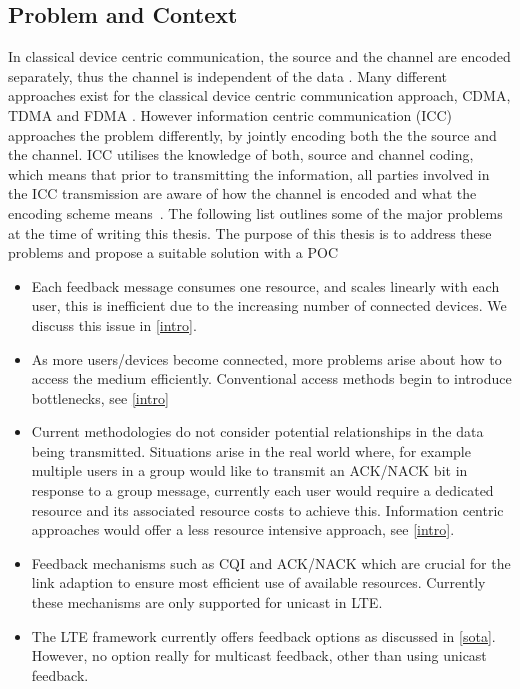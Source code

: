 \documentclass{article}
\begin{document}
\subsection{Problem and Context}\label{prob_context}
In classical device centric communication, the source and the channel are encoded separately, thus the channel is independent of the data \cite{shannon_theory}. Many different approaches exist for the classical device centric communication approach, CDMA, TDMA and FDMA \cite{multiple_access_protocols}.  However information centric communication (ICC) approaches the problem differently, by jointly encoding both the the source and the channel. ICC utilises the knowledge of both, source  and channel coding, which means that prior to transmitting the information, all parties involved in the ICC transmission are aware of how the channel is encoded and what the encoding scheme means~\cite{information_centric}. The following list outlines some of the major problems at the time of writing this thesis. The purpose of this thesis is to address these problems and propose a suitable solution with a \ac{POC}  

\begin{itemize}
  \item Each feedback message consumes one resource, and scales linearly with each user, this is inefficient due to the increasing number of connected devices. We discuss this issue in \cref{intro}.
  \item As more users/devices become connected, more problems arise about how to access the medium efficiently. Conventional access methods begin to introduce bottlenecks, see \cref{intro}
  \item Current methodologies do not consider potential relationships in the data being transmitted. Situations arise in the real world where, for example multiple users in a group would like to transmit an ACK/NACK bit in response to a group message, currently each user would require a dedicated resource and its associated resource costs to achieve this. Information centric approaches would offer a less resource intensive approach, see \cref{intro}. 
  \item Feedback mechanisms such as CQI and ACK/NACK which are crucial for the link adaption to ensure most efficient use of available resources. Currently these mechanisms are only supported for unicast in LTE. 
  \item The LTE framework currently offers feedback options as discussed in \cref{sota}. However, no option really for multicast feedback, other than using unicast feedback.
\end{itemize}
\end{document}
